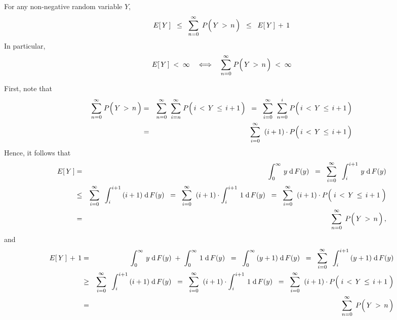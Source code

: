 \begin{lemma}\label{lemma:EYIsFiniteIFFSumPYGTnIsFinite}
\mbox{}
\vskip 0.1cm
\noindent
For any non-negative random variable $Y$,
\begin{equation*}
E\!\left[\,Y\,\right]
\;\; \leq \;\;
	\overset{\infty}{\underset{n = 0}{\sum}}\;\,P\!\left(\, \overset{{\color{white}.}}{Y} \,>\, n \,\right)
\;\; \leq \;\;
	E\!\left[\,Y\,\right] \,+\, 1
\end{equation*}
In particular,
\begin{equation*}
E\!\left[\,Y\,\right] \; < \; \infty
\quad \Longleftrightarrow \quad
	\overset{\infty}{\underset{n = 0}{\sum}}\;P\!\left(\, \overset{{\color{white}.}}{Y} \,>\, n \,\right) \; < \; \infty
\end{equation*}
\end{lemma}
\proof
First, note that
\begin{eqnarray*}
\overset{\infty}{\underset{n = 0}{\sum}}\;P\!\left(\, \overset{{\color{white}.}}{Y} \,>\, n \,\right)
& = &
	\overset{\infty}{\underset{n = 0}{\sum}}\;\;
	\overset{\infty}{\underset{i = n}{\sum}}\;
	P\!\left(\, i \,<\, \overset{{\color{white}.}}{Y} \,\leq\, i+1 \,\right)
\;\; = \;\;
	\overset{\infty}{\underset{i = 0}{\sum}}\;\;
	\overset{i}{\underset{n = 0}{\sum}}\;
	P\!\left(\, i \,<\, \overset{{\color{white}.}}{Y} \,\leq\, i+1 \,\right)
\\
& = &
	\overset{\infty}{\underset{i = 0}{\sum}}\;\;
	(i+1) \cdot P\!\left(\, i \,<\, \overset{{\color{white}.}}{Y} \,\leq\, i+1 \,\right)
\end{eqnarray*}
Hence, it follows that
\begin{eqnarray*}
E\!\left[\,Y\,\right]
&=&
	\int_{0}^{\infty}\, y \;\d\,F(y)
	\;\; = \;\;
		\overset{\infty}{\underset{i = 0}{\sum}}\;\;
		\int_{i}^{i+1}\, y \;\d\,F(y)
\\
& \leq &
		\overset{\infty}{\underset{i = 0}{\sum}}\;\;
		\int_{i}^{i+1}\, (i+1) \;\d\,F(y)
	\;\; = \;\;
		\overset{\infty}{\underset{i = 0}{\sum}}\;\;
		(i+1) \cdot \int_{i}^{i+1}\, 1 \;\d\,F(y)
	\;\; = \;\;
		\overset{\infty}{\underset{i = 0}{\sum}}\;\;
		(i+1) \cdot P\!\left(\; i \,<\, \overset{{\color{white}.}}{Y} \,\leq\, i+1 \;\right)
\\
& = &
	\overset{\infty}{\underset{n = 0}{\sum}}\;\,
	P\!\left(\, \overset{{\color{white}.}}{Y} \,>\, n \,\right),
\end{eqnarray*}
and
\begin{eqnarray*}
E\!\left[\,Y\,\right] \,+\, 1
&=&
	\int_{0}^{\infty}\, y \;\d\,F(y)
		\; + \;
		\int_{0}^{\infty}\, 1 \;\d\,F(y)
	\;\; = \;\;
		\int_{0}^{\infty}\, (y+1) \;\d\,F(y)
	\;\; = \;\;
		\overset{\infty}{\underset{i = 0}{\sum}}\;\;
		\int_{i}^{i+1}\, (y+1) \;\d\,F(y)
\\
& \geq &
		\overset{\infty}{\underset{i = 0}{\sum}}\;\;
		\int_{i}^{i+1}\, (i+1) \;\d\,F(y)
	\;\; = \;\;
		\overset{\infty}{\underset{i = 0}{\sum}}\;\;
		(i+1) \cdot \int_{i}^{i+1}\, 1 \;\d\,F(y)
	\;\; = \;\;
		\overset{\infty}{\underset{i = 0}{\sum}}\;\;
		(i+1) \cdot P\!\left(\; i \,<\, \overset{{\color{white}.}}{Y} \,\leq\, i+1 \;\right)
\\
& = &
	\overset{\infty}{\underset{n = 0}{\sum}}\;\,
	P\!\left(\, \overset{{\color{white}.}}{Y} \,>\, n \,\right)
\end{eqnarray*}
